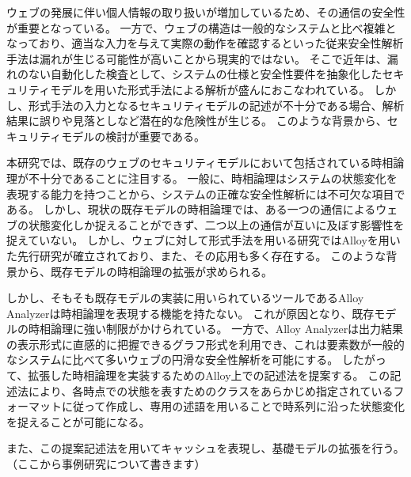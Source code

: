 \documentclass[12pt,a4paper]{jbook}
\begin{document}
ウェブの発展に伴い個人情報の取り扱いが増加しているため、その通信の安全性が重要となっている。
一方で、ウェブの構造は一般的なシステムと比べ複雑となっており、適当な入力を与えて実際の動作を確認するといった従来安全性解析手法は漏れが生じる可能性が高いことから現実的ではない。
そこで近年は、漏れのない自動化した検査として、システムの仕様と安全性要件を抽象化したセキュリティモデルを用いた形式手法による解析が盛んにおこなわれている。
しかし、形式手法の入力となるセキュリティモデルの記述が不十分である場合、解析結果に誤りや見落としなど潜在的な危険性が生じる。
このような背景から、セキュリティモデルの検討が重要である。

本研究では、既存のウェブのセキュリティモデルにおいて包括されている時相論理が不十分であることに注目する。
一般に、時相論理はシステムの状態変化を表現する能力を持つことから、システムの正確な安全性解析には不可欠な項目である。
しかし、現状の既存モデルの時相論理では、ある一つの通信によるウェブの状態変化しか捉えることができず、二つ以上の通信が互いに及ぼす影響性を捉えていない。
しかし、ウェブに対して形式手法を用いる研究ではAlloyを用いた先行研究が確立されており、また、その応用も多く存在する。
このような背景から、既存モデルの時相論理の拡張が求められる。

しかし、そもそも既存モデルの実装に用いられているツールであるAlloy Analyzerは時相論理を表現する機能を持たない。
これが原因となり、既存モデルの時相論理に強い制限がかけられている。
一方で、Alloy Analyzerは出力結果の表示形式に直感的に把握できるグラフ形式を利用でき、これは要素数が一般的なシステムに比べて多いウェブの円滑な安全性解析を可能にする。
したがって、拡張した時相論理を実装するためのAlloy上での記述法を提案する。
この記述法により、各時点での状態を表すためのクラスをあらかじめ指定されているフォーマットに従って作成し、専用の述語を用いることで時系列に沿った状態変化を捉えることが可能になる。

また、この提案記述法を用いてキャッシュを表現し、基礎モデルの拡張を行う。
\\（ここから事例研究について書きます）
\end{document}
